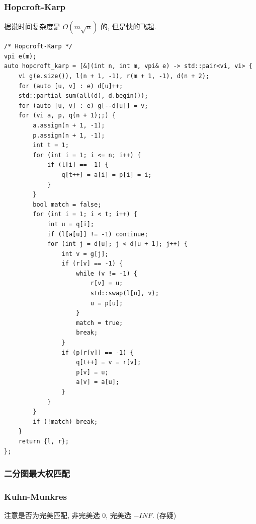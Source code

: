 \documentclass[UTF8, a4paper, titlepage, twoside]{ctexart}
\begin{document}
\subsubsection*{ Hopcroft-Karp }
据说时间复杂度是 \(O(m \sqrt{n})\) 的, 但是快的飞起.

\begin{lstlisting}[style=cpp]
/* Hopcroft-Karp */
vpi e(m);
auto hopcroft_karp = [&](int n, int m, vpi& e) -> std::pair<vi, vi> {
    vi g(e.size()), l(n + 1, -1), r(m + 1, -1), d(n + 2);
    for (auto [u, v] : e) d[u]++;
    std::partial_sum(all(d), d.begin());
    for (auto [u, v] : e) g[--d[u]] = v;
    for (vi a, p, q(n + 1);;) {
        a.assign(n + 1, -1);
        p.assign(n + 1, -1);
        int t = 1;
        for (int i = 1; i <= n; i++) {
            if (l[i] == -1) {
                q[t++] = a[i] = p[i] = i;
            }
        }
        bool match = false;
        for (int i = 1; i < t; i++) {
            int u = q[i];
            if (l[a[u]] != -1) continue;
            for (int j = d[u]; j < d[u + 1]; j++) {
                int v = g[j];
                if (r[v] == -1) {
                    while (v != -1) {
                        r[v] = u;
                        std::swap(l[u], v);
                        u = p[u];
                    }
                    match = true;
                    break;
                }
                if (p[r[v]] == -1) {
                    q[t++] = v = r[v];
                    p[v] = u;
                    a[v] = a[u];
                }
            }
        }
        if (!match) break;
    }
    return {l, r};
};
\end{lstlisting}

\subsubsection*{ 二分图最大权匹配 }
\subsubsection*{ Kuhn-Munkres }
注意是否为完美匹配, 非完美选 \(0\), 完美选 \(-INF\). (存疑)
\end{document}
